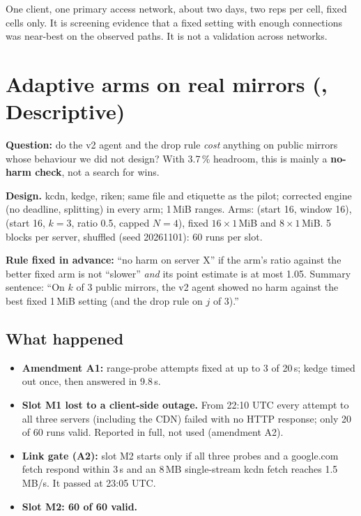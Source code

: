 \begin{careful}
One client, one primary access network, about two days, two reps per cell, fixed cells only. It is screening evidence that a fixed setting with enough connections was near-best on the observed paths. It is not a validation across networks.
\end{careful}

\section{Adaptive arms on real mirrors (, Descriptive)}
\textbf{Question:} do the v2 agent and the drop rule \emph{cost} anything on public mirrors whose behaviour we did not design? With 3.7\,\% headroom, this is mainly a \textbf{no-harm check}, not a search for wins.

\textbf{Design.} kcdn, kedge, riken; same file and etiquette as the pilot; corrected engine (no deadline, splitting) in every arm; 1\,MiB ranges. Arms:  (start 16, window 16),  (start 16, $k=3$, ratio 0.5, capped $N=4$), fixed $16\times1$\,MiB and $8\times1$\,MiB. 5 blocks per server, shuffled (seed 20261101): 60 runs per slot.

\textbf{Rule fixed in advance:} ``no harm on server X'' if the arm's ratio against the better fixed arm is not ``slower'' \emph{and} its point estimate is at most 1.05. Summary sentence: ``On $k$ of 3 public mirrors, the v2 agent showed no harm against the best fixed 1\,MiB setting (and the drop rule on $j$ of 3).''

\subsection{What happened}
\begin{itemize}
\item \textbf{Amendment A1:} range-probe attempts fixed at up to 3 of 20\,s; kedge timed out once, then answered  in 9.8\,s.
\item \textbf{Slot M1 lost to a client-side outage.} From 22:10 UTC every attempt to all three servers (including the CDN) failed with no HTTP response; only 20 of 60 runs valid. Reported in full, not used (amendment A2).
\item \textbf{Link gate (A2):} slot M2 starts only if all three probes and a google.com fetch respond within 3\,s and an 8\,MB single-stream kcdn fetch reaches 1.5\,MB/s. It passed at 23:05 UTC.
\item \textbf{Slot M2: 60 of 60 valid.}
\end{itemize}

